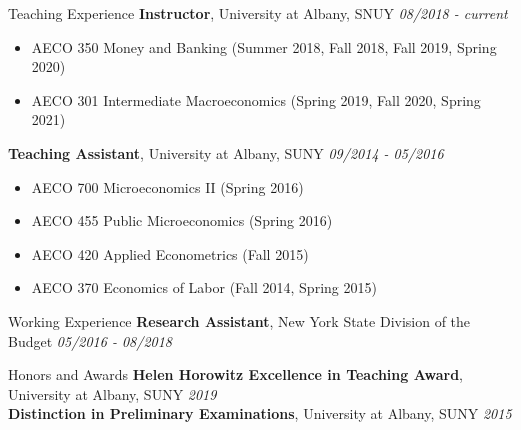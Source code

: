 \documentclass{resume} %
\begin{document}
\begin{rSection}{Teaching Experience}
{\bf Instructor}{, University at Albany, SNUY} \hfill {\em 08/2018 - current}
 \begin{itemize}
     \item[] AECO 350 Money and Banking (Summer 2018, Fall 2018, Fall 2019, Spring 2020) 
     \item[] AECO 301 Intermediate Macroeconomics (Spring 2019, Fall 2020, Spring 2021)
 \end{itemize} 
{\bf Teaching Assistant}{, University at Albany, SUNY} \hfill {\em 09/2014 - 05/2016}
   \begin{itemize}
     \item[] AECO 700 Microeconomics II (Spring 2016)
     \item[] AECO 455 Public Microeconomics (Spring 2016)
     \item[] AECO 420 Applied Econometrics (Fall 2015)
     \item[] AECO 370 Economics of Labor (Fall 2014, Spring 2015) 
   \end{itemize} 
\end{rSection}
\bigskip \bigskip





\begin{rSection}{Working Experience}
	{\bf Research Assistant}{, New York State Division of the Budget} \hfill {\em 05/2016 - 08/2018}
\end{rSection}
\bigskip \bigskip






\begin{rSection}{Honors and Awards} 
{\bf Helen Horowitz Excellence in Teaching Award}{, University at Albany, SUNY} \hfill{\em 2019}  \\ 
{\bf Distinction in Preliminary Examinations}{, University at Albany, SUNY} \hfill{\em 2015}  \\
\end{rSection}
\bigskip \bigskip
\end{document}
